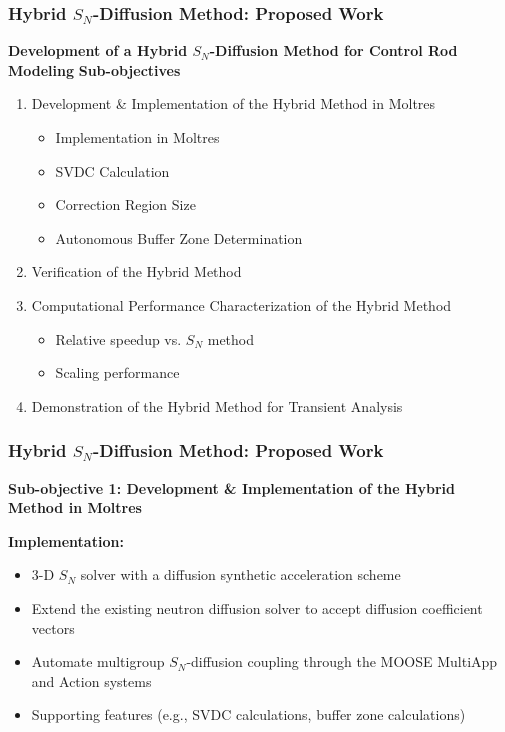 \begin{frame}
  \frametitle{Hybrid $S_N$-Diffusion Method: Proposed Work}
  \begin{block}{\textbf{Development of a Hybrid $S_N$-Diffusion Method for Control Rod Modeling}}
    \textbf{Sub-objectives}
    \begin{enumerate}
      \item Development \& Implementation of the Hybrid Method in Moltres
        \begin{itemize}
          \item Implementation in Moltres
          \item SVDC Calculation
          \item Correction Region Size
          \item Autonomous Buffer Zone Determination
        \end{itemize}
      \item Verification of the Hybrid Method
      \item Computational Performance Characterization of the Hybrid Method
        \begin{itemize}
          \item Relative speedup vs. $S_N$ method
          \item Scaling performance
        \end{itemize}
      \item Demonstration of the Hybrid Method for Transient Analysis
    \end{enumerate}
  \end{block}
\end{frame}

\begin{frame}
  \frametitle{Hybrid $S_N$-Diffusion Method: Proposed Work}
  \textbf{Sub-objective 1: Development \& Implementation of the Hybrid Method in Moltres}
  \vspace{.2cm}

  \textbf{Implementation:}
  \begin{itemize}
    \item 3-D $S_N$ solver with a diffusion synthetic acceleration scheme
    \item Extend the existing neutron diffusion solver to accept diffusion coefficient vectors
    \item Automate multigroup $S_N$-diffusion coupling through the MOOSE MultiApp and Action
      systems
    \item Supporting features (e.g., SVDC calculations, buffer zone calculations)
  \end{itemize}
\end{frame}

